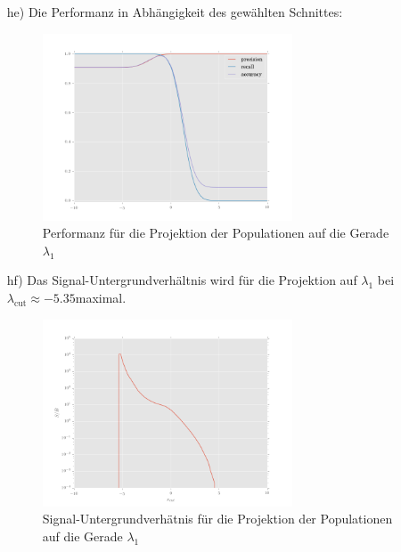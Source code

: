 \begin{itemize}
\item[he)] Die Performanz in Abhängigkeit des gewählten Schnittes:
\begin{figure}[H]
	\centering
	\includegraphics[width=0.7\textwidth]{performace_1_h.png}
	\caption{Performanz für die Projektion der Populationen auf die Gerade $\lambda_1$}
\end{figure}

\item[hf)] Das Signal-Untergrundverhältnis wird für die Projektion auf $\lambda_1$ bei $\lambda_{\text{cut}}\approx -5.35$maximal.
\begin{figure}[H]
	\centering
	\includegraphics[width=0.7\textwidth]{sig_bkg_ratio_h.png}
	\caption{Signal-Untergrundverhätnis für die Projektion der Populationen auf die Gerade $\lambda_1$}
\end{figure}



\end{itemize}
